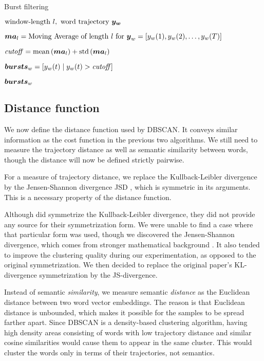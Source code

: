 \begin{algorithm}[H]
\begin{algorithmic}[1]
\caption{Burst filtering}
\label{alg:burst-filtering}
\Input $\text{window-length} \ l,\ \text{word trajectory} \ \vect{\traj_{w}}$

\State $\vect{MA}_{l} = \text{Moving Average of length} ~ l ~ \text{for} ~ \vect{\traj}_{w} = \left[ \traj_{w}(1), \traj_{w}(2), \dots, \traj_{w}(\streamlen) \right]$

\State $\mathit{cutoff} = \text{mean} \left( \vect{MA}_{l} \right) + \text{std} \left( \vect{MA}_{l} \right)$

\State $\vect{bursts}_{w} = \left[ \traj_{w}(t) \mid \traj_{w	}(t) > \mathit{cutoff} \right]$

\Output $\vect{bursts}_{w}$
\end{algorithmic}
\end{algorithm}


\subsection{Distance function}
We now define the distance function used by DBSCAN. It conveys similar information as the cost function in the previous two algorithms. We still need to measure the trajectory distance as well as semantic similarity between words, though the distance will now be defined strictly pairwise.

For a measure of trajectory distance, we replace the Kullback-Leibler divergence by the Jensen-Shannon divergence JSD \citep{js-divergence-1}, which is symmetric in its arguments. This is a necessary property of the distance function.

Although \cite{event-detection} did symmetrize the Kullback-Leibler divergence, they did not provide any source for their symmetrization form. We were unable to find a case where that particular form was used, though we discovered the Jensen-Shannon divergence, which comes from stronger mathematical background \citep{js-divergence-1, js-divergence-2}. It also tended to improve the clustering quality during our experimentation, as opposed to the original symmetrization. We then decided to replace the original paper's KL-divergence symmetrization by the JS-divergence.

Instead of semantic \textit{similarity}, we measure semantic \textit{distance} as the Euclidean distance between two word vector embeddings. The reason is that Euclidean distance is unbounded, which makes it possible for the samples to be spread farther apart. Since DBSCAN is a density-based clustering algorithm, having high density areas consisting of words with low trajectory distance and similar cosine similarities would cause them to appear in the same cluster. This would cluster the words only in terms of their trajectories, not semantics.

